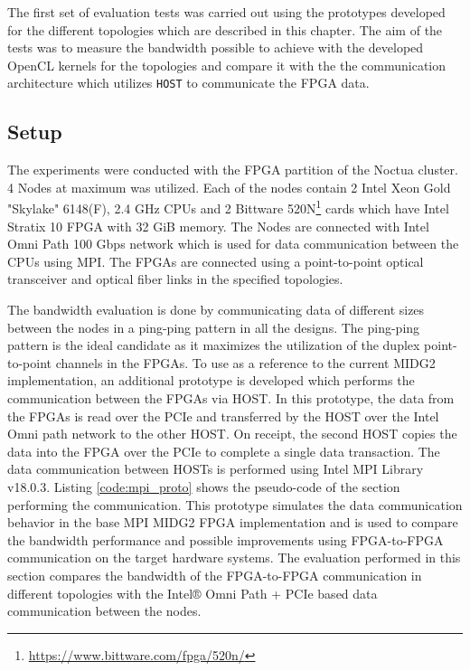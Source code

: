 The first set of evaluation tests was carried out using the prototypes
developed for the different topologies which are described in this chapter.
The aim of the tests was to measure the bandwidth possible to achieve with the
developed OpenCL kernels for the topologies and compare it with the
the communication architecture which utilizes \texttt{HOST} to communicate the
FPGA data.

\subsection{Setup}

The experiments were conducted with the FPGA partition of the Noctua
cluster. 4 Nodes at maximum was utilized. Each of the nodes
contain 2 Intel Xeon Gold "Skylake" 6148(F), 2.4 GHz CPUs and
2 Bittware 520N\footnote{\url{https://www.bittware.com/fpga/520n/}}
cards which have Intel Stratix 10 FPGA with 32 GiB memory. The Nodes
are connected with Intel Omni Path 100 Gbps network which is used
for data communication between the CPUs using MPI. The FPGAs
are connected using a point-to-point optical transceiver and
optical fiber links in the specified topologies.

The bandwidth evaluation is done by communicating data of different
sizes between the nodes in a ping-ping pattern in all the designs.
The ping-ping pattern is the ideal candidate as it maximizes
the utilization of the duplex point-to-point channels in the
FPGAs. To use as a reference to the current MIDG2 implementation,
an additional prototype is developed which performs the communication
between the FPGAs via HOST. In this prototype, the data from the FPGAs
is read over the PCIe and transferred by the HOST over the Intel
Omni path network to the other HOST. On receipt, the second HOST
copies the data into the FPGA over the PCIe to complete a single data
transaction. The data communication between HOSTs is performed using
Intel MPI Library v18.0.3. Listing \ref{code:mpi_proto} shows the pseudo-code of the section
performing the communication. This prototype simulates the data communication
behavior in the base MPI MIDG2 FPGA implementation and is used to compare the
bandwidth performance and possible improvements using FPGA-to-FPGA communication
on the target hardware systems. The evaluation performed in this
section compares the bandwidth of the FPGA-to-FPGA communication
in  different topologies with the Intel® Omni Path + PCIe based
data communication between the nodes.

